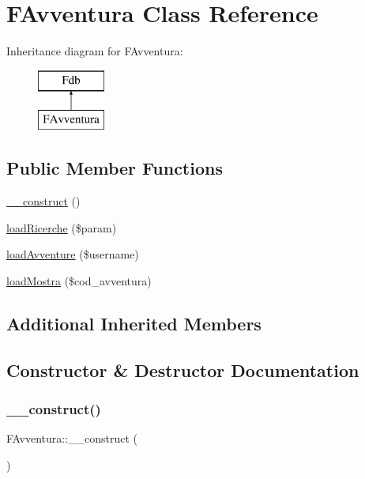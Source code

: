 \hypertarget{class_f_avventura}{}\section{F\+Avventura Class Reference}
\label{class_f_avventura}
Inheritance diagram for F\+Avventura\+:\begin{figure}[H]
\begin{center}
\leavevmode
\includegraphics[height=2.000000cm]{class_f_avventura}
\end{center}
\end{figure}
\subsection*{Public Member Functions}
\begin{DoxyCompactItemize}
\item 
\mbox{\hyperlink{class_f_avventura_ac343e12d6797fb78c672743d19c5ec96}{\+\_\+\+\_\+construct}} ()
\item 
\mbox{\hyperlink{class_f_avventura_a12a0c627090bf099850b89ab6b515e3a}{load\+Ricerche}} (\$param)
\item 
\mbox{\hyperlink{class_f_avventura_a11b7c09eb9588c5aa5b3fb9c7a69855a}{load\+Avventure}} (\$username)
\item 
\mbox{\hyperlink{class_f_avventura_aa73d72dc5bb5840a03b850e208ad4568}{load\+Mostra}} (\$cod\+\_\+avventura)
\end{DoxyCompactItemize}
\subsection*{Additional Inherited Members}


\subsection{Constructor \& Destructor Documentation}
\mbox{\label{class_f_avventura_ac343e12d6797fb78c672743d19c5ec96}} 
\subsubsection{\texorpdfstring{\+\_\+\+\_\+construct()}{\_\_construct()}}
{\footnotesize\ttfamily F\+Avventura\+::\+\_\+\+\_\+construct (\begin{DoxyParamCaption}{ }\end{DoxyParamCaption})}

